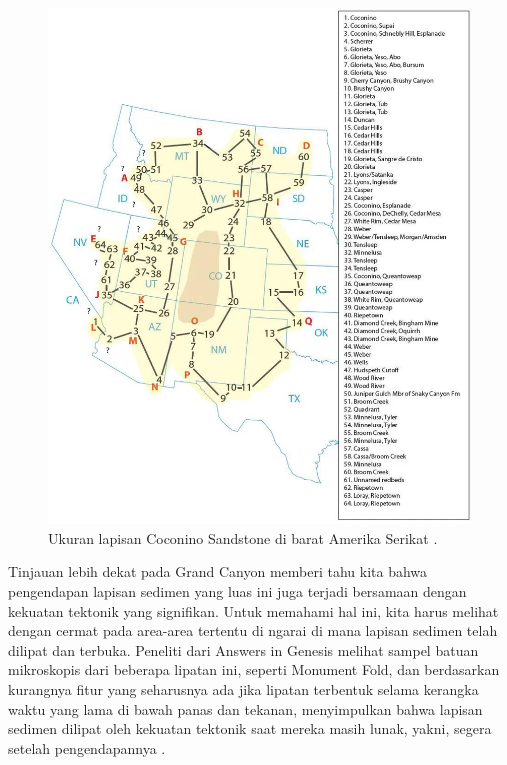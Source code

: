 \documentclass[10pt,twocolumn,letterpaper]{article}
\begin{document}
\begin{figure}[t]
\begin{center}
   \includegraphics[width=1\linewidth]{coconino.jpg}
\end{center}
   \caption{Ukuran lapisan Coconino Sandstone di barat Amerika Serikat \cite{21}.}
\label{fig:3}
\label{fig:onecol}
\end{figure}

Tinjauan lebih dekat pada Grand Canyon memberi tahu kita bahwa pengendapan lapisan sedimen yang luas ini juga terjadi bersamaan dengan kekuatan tektonik yang signifikan. Untuk memahami hal ini, kita harus melihat dengan cermat pada area-area tertentu di ngarai di mana lapisan sedimen telah dilipat dan terbuka. Peneliti dari Answers in Genesis \cite{42} melihat sampel batuan mikroskopis dari beberapa lipatan ini, seperti Monument Fold, dan berdasarkan kurangnya fitur yang seharusnya ada jika lipatan terbentuk selama kerangka waktu yang lama di bawah panas dan tekanan, menyimpulkan bahwa lapisan sedimen dilipat oleh kekuatan tektonik saat mereka masih lunak, yakni, segera setelah pengendapannya \cite{43}.
\end{document}
